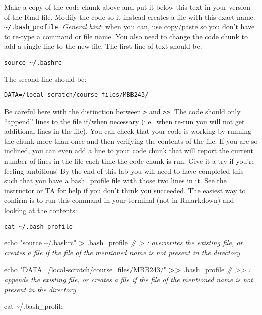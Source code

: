 \documentclass[
]{article}
\newenvironment{Shaded}{\begin{snugshade}}{\end{snugshade}}
\newcommand{\BuiltInTok}[1]{#1}
\newcommand{\CommentTok}[1]{\textcolor[rgb]{0.56,0.35,0.01}{\textit{#1}}}
\newcommand{\FunctionTok}[1]{\textcolor[rgb]{0.00,0.00,0.00}{#1}}
\newcommand{\NormalTok}[1]{#1}
\newcommand{\OperatorTok}[1]{\textcolor[rgb]{0.81,0.36,0.00}{\textbf{#1}}}
\newcommand{\StringTok}[1]{\textcolor[rgb]{0.31,0.60,0.02}{#1}}
\begin{document}
Make a copy of the code chunk above and put it below this text in your
version of the Rmd file. Modify the code so it instead creates a file
with this exact name: \texttt{\textasciitilde{}/.bash\_profile}.
\emph{General hint}: when you can, use copy/paste so you don't have to
re-type a command or file name. You also need to change the code chunk
to add a single line to the new file. The first line of text should be:

\texttt{source\ \textasciitilde{}/.bashrc}

The second line should be:

\texttt{DATA=/local-scratch/course\_files/MBB243/}

Be careful here with the distinction between \texttt{\textgreater{}} and
\texttt{\textgreater{}\textgreater{}}. The code should only ``append''
lines to the file if/when necessary (i.e.~when re-run you will not get
additional lines in the file). You can check that your code is working
by running the chunk more than once and then verifying the contents of
the file. If you are so inclined, you can even add a line to your code
chunk that will report the current number of lines in the file each time
the code chunk is run. Give it a try if you're feeling ambitious! By the
end of this lab you will need to have completed this such that you have
a bash\_profile file with those two lines in it. See the instructor or
TA for help if you don't think you succeeded. The easiest way to confirm
is to run this command in your terminal (not in Rmarkdown) and looking
at the contents:

\texttt{cat\ \textasciitilde{}/.bash\_profile}

\begin{Shaded}
\begin{Highlighting}[]
\BuiltInTok{echo} \StringTok{"source \textasciitilde{}/.bashrc"} \OperatorTok{\textgreater{}}\NormalTok{ .bash\_profile}
\CommentTok{\# \textgreater{} : overwrites the existing file, or creates a file if the file of the mentioned name is not present in the directory}

\BuiltInTok{echo} \StringTok{"DATA=/local{-}scratch/course\_files/MBB243/"} \OperatorTok{\textgreater{}\textgreater{}}\NormalTok{ .bash\_profile}
\CommentTok{\# \textgreater{}\textgreater{} : appends the existing file, or creates a file if the file of the mentioned name is not present in the directory}

\FunctionTok{cat}\NormalTok{ \textasciitilde{}/.bash\_profile}
\end{Highlighting}
\end{Shaded}
\end{document}
